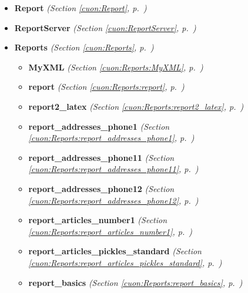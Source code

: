 \begin{itemize}
\item \textbf{Report}
  \textit{(Section \ref{cuon:Report}, p.~\pageref{cuon:Report})}

\item \textbf{ReportServer}
  \textit{(Section \ref{cuon:ReportServer}, p.~\pageref{cuon:ReportServer})}

\item \textbf{Reports}
  \textit{(Section \ref{cuon:Reports}, p.~\pageref{cuon:Reports})}

  \begin{itemize}
\setlength{\parskip}{0ex}
    \item \textbf{MyXML}
  \textit{(Section \ref{cuon:Reports:MyXML}, p.~\pageref{cuon:Reports:MyXML})}

    \item \textbf{report}
  \textit{(Section \ref{cuon:Reports:report}, p.~\pageref{cuon:Reports:report})}

    \item \textbf{report2\_latex}
  \textit{(Section \ref{cuon:Reports:report2_latex}, p.~\pageref{cuon:Reports:report2_latex})}

    \item \textbf{report\_addresses\_phone1}
  \textit{(Section \ref{cuon:Reports:report_addresses_phone1}, p.~\pageref{cuon:Reports:report_addresses_phone1})}

    \item \textbf{report\_addresses\_phone11}
  \textit{(Section \ref{cuon:Reports:report_addresses_phone11}, p.~\pageref{cuon:Reports:report_addresses_phone11})}

    \item \textbf{report\_addresses\_phone12}
  \textit{(Section \ref{cuon:Reports:report_addresses_phone12}, p.~\pageref{cuon:Reports:report_addresses_phone12})}

    \item \textbf{report\_articles\_number1}
  \textit{(Section \ref{cuon:Reports:report_articles_number1}, p.~\pageref{cuon:Reports:report_articles_number1})}

    \item \textbf{report\_articles\_pickles\_standard}
  \textit{(Section \ref{cuon:Reports:report_articles_pickles_standard}, p.~\pageref{cuon:Reports:report_articles_pickles_standard})}

    \item \textbf{report\_basics}
  \textit{(Section \ref{cuon:Reports:report_basics}, p.~\pageref{cuon:Reports:report_basics})}


\end{itemize}
\end{itemize}
